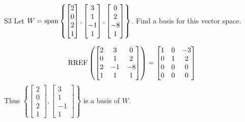 \begin{problem}{S3}
Let \(
  W={\rm span}\left\{
    \begin{bmatrix} 2 \\ 0 \\ 2 \\ 1 \end{bmatrix},
    \begin{bmatrix} 3 \\ 1 \\ -1 \\ 1 \end{bmatrix},
    \begin{bmatrix} 0 \\ 2 \\ -8 \\ 1 \end{bmatrix}
  \right\}
\). Find a basis for this vector space.
\end{problem}
\begin{solution}
\[
  \operatorname{RREF}\left(\begin{bmatrix}
    2 & 3 & 0 \\
    0 & 1 & 2 \\
    2 & -1 & -8 \\
    1 & 1 & 1
  \end{bmatrix} \right) =
  \begin{bmatrix}
    1 & 0 & -3 \\
    0 & 1 & 2 \\
    0 & 0 & 0 \\
    0 & 0 & 0
  \end{bmatrix}
\]
Thus \(\left\{
  \begin{bmatrix} 2 \\ 0 \\ 2 \\ 1 \end{bmatrix},
  \begin{bmatrix} 3 \\ 1 \\ -1 \\ 1 \end{bmatrix}
\right\}\) is a basis of $W$.
\end{solution}
